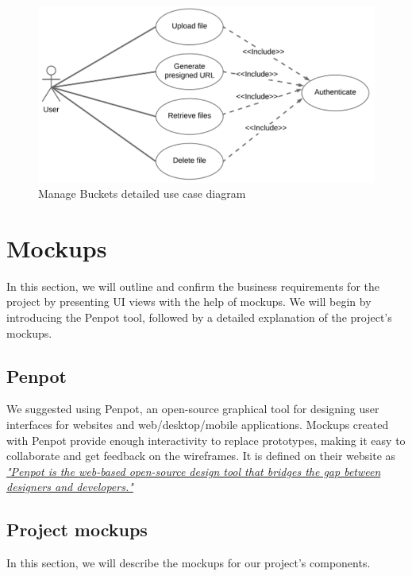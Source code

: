 \begin{itemize}
\begin{figure}[h]
  \center
  \includegraphics[width=15cm]{use_case-manage_bucket2}
  \caption{Manage Buckets detailed use case diagram}
  \label{fig:use_case-manage_bucket2}
\end{figure}




\end{itemize}


\section{Mockups}
In this section, we will outline and confirm the business requirements for the project by presenting UI views 
with the help of mockups. We will begin by introducing the Penpot tool,
followed by a detailed explanation of the project's mockups.



\subsection{Penpot}
We suggested using Penpot, an open-source graphical tool for designing user interfaces for websites and
web/desktop/mobile applications. Mockups created with Penpot provide enough interactivity to replace prototypes,
making it easy to collaborate and get feedback on the wireframes. It is defined on their website as \href{https://penpot.app/}{\textit{"Penpot is the web-based open-source design tool that bridges the gap between designers and developers."}}


\subsection{Project mockups}
In this section, we will describe the mockups for our project’s components.

